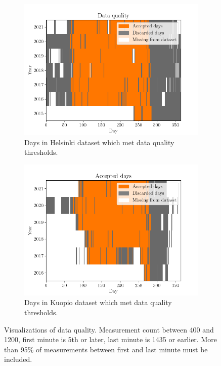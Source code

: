 \begin{figure}[h]
	
     \centering
     \begin{subfigure}[b]{0.48\textwidth}
         \centering
         \includegraphics[width=\textwidth]{pics/helsinki_accepted_days}
         \caption{Days in Helsinki dataset which met data quality thresholds.}
         \label{fig_helsinki_accepted}
     \end{subfigure}
     \hfill
     \begin{subfigure}[b]{0.48\textwidth}
         \centering
         \includegraphics[width=\textwidth]{pics/kuopio_accepted_days}
         \caption{Days in Kuopio dataset which met data quality thresholds.}
         
         \label{fig_kuopio_accepted}
     \end{subfigure}
     \hfill
     \caption{Visualizations of data quality. Measurement count between 400 and 1200, first minute is 5th or later, last minute is 1435 or earlier. More than 95\% of measurements between first and last minute must be included.}
     \label{fig_accepted_days}
     
\end{figure}


